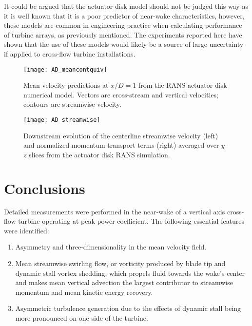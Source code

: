 It could be argued that the actuator disk model should not be judged this way as
it is well known that it is a poor predictor of near-wake characteristics,
however, these models are common in engineering practice when calculating
performance of turbine arrays, as previously mentioned. The experiments reported
here have shown that the use of these models would likely be a source of large
uncertainty if applied to cross-flow turbine installations.

\begin{figure}
    \centering
    
    \texttt{[image: AD\_meancontquiv]}

    \caption{Mean velocity predictions at $x/D=1$ from the RANS actuator disk
        numerical model. Vectors are cross-stream and vertical velocities; contours
        are streamwise velocity.}
    
    \label{fig:AD-contours}
\end{figure}

\begin{figure}
    \centering 
    
    \texttt{[image: AD\_streamwise]}
    
    \caption{Downstream evolution of the centerline streamwise velocity (left)
        and normalized momentum transport terms (right) averaged over $y$--$z$
        slices from the actuator disk RANS simulation.} 
    
    \label{fig:AD-streamwise}
\end{figure}

\section{Conclusions}

Detailed measurements were performed in the near-wake of a vertical axis
cross-flow turbine operating at peak power coefficient. The following essential
features were identified:

\begin{enumerate}
    \item Asymmetry and three-dimensionality in the mean velocity field. 
    
    \item Mean streamwise swirling flow, or vorticity produced by blade tip and
    dynamic stall vortex shedding, which propels fluid towards the wake's center
    and makes mean vertical advection the largest contributor to streamwise
    momentum and mean kinetic energy recovery.
    
    \item Asymmetric turbulence generation due to the effects of dynamic stall
    being more pronounced on one side of the turbine.
\end{enumerate}


